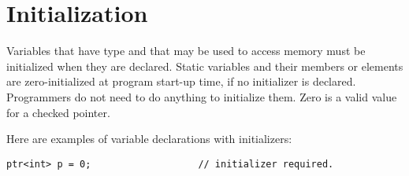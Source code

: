 \section{Initialization}

Variables that have \ptrT type and that may be used to access memory
must be initialized when they are declared. Static variables and their members or elements are zero-initialized at program
start-up time, if no initializer is declared. Programmers do not need to do anything to
initialize them. Zero is a valid value for a checked pointer.

Here are examples of variable declarations with initializers:
\begin{lstlisting}
ptr<int> p = 0;                   // initializer required.
\end{lstlisting}
